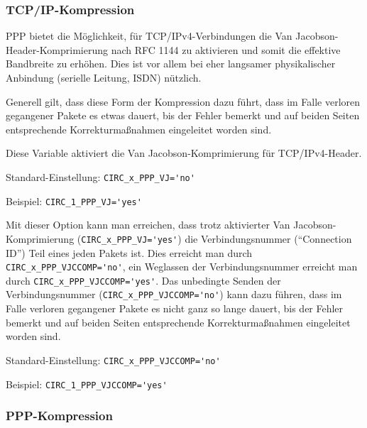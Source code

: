 \subsubsection{TCP/IP-Kompression}

PPP bietet die Möglichkeit, für TCP/IPv4-Verbindungen die Van Jacobson-
Header-Kompri\-mierung nach RFC 1144 zu aktivieren und somit die effektive
Bandbreite zu erhöhen. Dies ist vor allem bei eher langsamer physikalischer
Anbindung (serielle Leitung, ISDN) nützlich.

Generell gilt, dass diese Form der Kompression dazu führt, dass im Falle
verloren gegangener Pakete es etwas dauert, bis der Fehler bemerkt und auf
beiden Seiten entsprechende Korrekturmaßnahmen eingeleitet worden sind.

\begin{description}


Diese Variable aktiviert die Van Jacobson-Komprimierung für TCP/IPv4-Header.

Standard-Einstellung: \verb+CIRC_x_PPP_VJ='no'+

Beispiel: \verb+CIRC_1_PPP_VJ='yes'+


Mit dieser Option kann man erreichen, dass trotz aktivierter
Van Jacobson-Komprimierung (\verb+CIRC_x_PPP_VJ='yes'+) die Verbindungsnummer
(``Connection ID'') Teil eines jeden Pakets ist. Dies erreicht man durch
\verb+CIRC_x_PPP_VJCCOMP='no'+, ein Weglassen der Verbindungsnummer erreicht man
durch \verb+CIRC_x_PPP_VJCCOMP='yes'+. Das unbedingte Senden der
Verbindungsnummer (\verb+CIRC_x_PPP_VJCCOMP='no'+) kann dazu führen, dass
im Falle verloren gegangener Pakete es nicht ganz so lange dauert, bis der
Fehler bemerkt und auf beiden Seiten entsprechende Korrekturmaßnahmen
eingeleitet worden sind.

Standard-Einstellung: \verb+CIRC_x_PPP_VJCCOMP='no'+

Beispiel: \verb+CIRC_1_PPP_VJCCOMP='yes'+

\end{description}

\subsubsection{PPP-Kompression}

